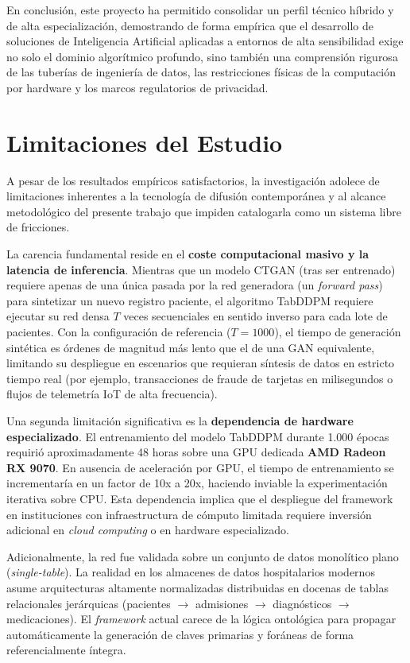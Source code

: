 En conclusión, este proyecto ha permitido consolidar un perfil técnico híbrido y de alta especialización, demostrando de forma empírica que el desarrollo de soluciones de Inteligencia Artificial aplicadas a entornos de alta sensibilidad exige no solo el dominio algorítmico profundo, sino también una comprensión rigurosa de las tuberías de ingeniería de datos, las restricciones físicas de la computación por hardware y los marcos regulatorios de privacidad.

\section{Limitaciones del Estudio}

A pesar de los resultados empíricos satisfactorios, la investigación adolece de limitaciones inherentes a la tecnología de difusión contemporánea y al alcance metodológico del presente trabajo que impiden catalogarla como un sistema libre de fricciones.

La carencia fundamental reside en el \textbf{coste computacional masivo y la latencia de inferencia}. Mientras que un modelo CTGAN (tras ser entrenado) requiere apenas de una única pasada por la red generadora (un \textit{forward pass}) para sintetizar un nuevo registro paciente, el algoritmo TabDDPM requiere ejecutar su red densa $T$ veces secuenciales en sentido inverso para cada lote de pacientes. Con la configuración de referencia ($T=1000$), el tiempo de generación sintética es órdenes de magnitud más lento que el de una GAN equivalente, limitando su despliegue en escenarios que requieran síntesis de datos en estricto tiempo real (por ejemplo, transacciones de fraude de tarjetas en milisegundos o flujos de telemetría IoT de alta frecuencia).

Una segunda limitación significativa es la \textbf{dependencia de hardware especializado}. El entrenamiento del modelo TabDDPM durante 1.000 épocas requirió aproximadamente 48 horas sobre una GPU dedicada \textbf{AMD Radeon RX 9070}. En ausencia de aceleración por GPU, el tiempo de entrenamiento se incrementaría en un factor de 10x a 20x, haciendo inviable la experimentación iterativa sobre CPU. Esta dependencia implica que el despliegue del framework en instituciones con infraestructura de cómputo limitada requiere inversión adicional en \textit{cloud computing} o en hardware especializado.

Adicionalmente, la red fue validada sobre un conjunto de datos monolítico plano (\textit{single-table}). La realidad en los almacenes de datos hospitalarios modernos asume arquitecturas altamente normalizadas distribuidas en docenas de tablas relacionales jerárquicas (pacientes $\rightarrow$ admisiones $\rightarrow$ diagnósticos $\rightarrow$ medicaciones). El \textit{framework} actual carece de la lógica ontológica para propagar automáticamente la generación de claves primarias y foráneas de forma referencialmente íntegra.

